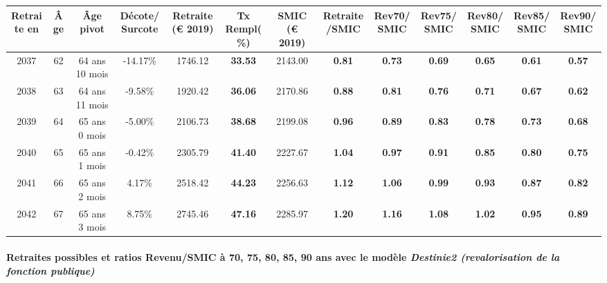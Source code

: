 { \scriptsize \begin{center} 
\begin{tabular}[htb]{|c|c||c|c||c|c||c||c|c|c|c|c|c|} 
\hline 
 Retraite en &  Âge &  Âge pivot &  Décote/Surcote &  Retraite (\euro{} 2019) &  Tx Rempl(\%) &  SMIC (\euro{} 2019) &  Retraite/SMIC &  Rev70/SMIC &  Rev75/SMIC &  Rev80/SMIC &  Rev85/SMIC &  Rev90/SMIC \\ 
\hline \hline 
 2037 &  62 &  64 ans 10 mois &  -14.17\% &  1746.12 &  {\bf 33.53} &  2143.00 &  {\bf {\color{red} 0.81}} &  {\bf {\color{red} 0.73}} &  {\bf {\color{red} 0.69}} &  {\bf {\color{red} 0.65}} &  {\bf {\color{red} 0.61}} &  {\bf {\color{red} 0.57}} \\ 
\hline 
 2038 &  63 &  64 ans 11 mois &  -9.58\% &  1920.42 &  {\bf 36.06} &  2170.86 &  {\bf {\color{red} 0.88}} &  {\bf {\color{red} 0.81}} &  {\bf {\color{red} 0.76}} &  {\bf {\color{red} 0.71}} &  {\bf {\color{red} 0.67}} &  {\bf {\color{red} 0.62}} \\ 
\hline 
 2039 &  64 &  65 ans 0 mois &  -5.00\% &  2106.73 &  {\bf 38.68} &  2199.08 &  {\bf {\color{red} 0.96}} &  {\bf {\color{red} 0.89}} &  {\bf {\color{red} 0.83}} &  {\bf {\color{red} 0.78}} &  {\bf {\color{red} 0.73}} &  {\bf {\color{red} 0.68}} \\ 
\hline 
 2040 &  65 &  65 ans 1 mois &  -0.42\% &  2305.79 &  {\bf 41.40} &  2227.67 &  {\bf 1.04} &  {\bf {\color{red} 0.97}} &  {\bf {\color{red} 0.91}} &  {\bf {\color{red} 0.85}} &  {\bf {\color{red} 0.80}} &  {\bf {\color{red} 0.75}} \\ 
\hline 
 2041 &  66 &  65 ans 2 mois &  4.17\% &  2518.42 &  {\bf 44.23} &  2256.63 &  {\bf 1.12} &  {\bf 1.06} &  {\bf {\color{red} 0.99}} &  {\bf {\color{red} 0.93}} &  {\bf {\color{red} 0.87}} &  {\bf {\color{red} 0.82}} \\ 
\hline 
 2042 &  67 &  65 ans 3 mois &  8.75\% &  2745.46 &  {\bf 47.16} &  2285.97 &  {\bf 1.20} &  {\bf 1.16} &  {\bf 1.08} &  {\bf 1.02} &  {\bf {\color{red} 0.95}} &  {\bf {\color{red} 0.89}} \\ 
\hline 
\hline 
\end{tabular} 
\end{center} } 
\paragraph{Retraites possibles et ratios Revenu/SMIC à 70, 75, 80, 85, 90 ans avec le modèle \emph{Destinie2 (revalorisation de la fonction publique)}}  
 
